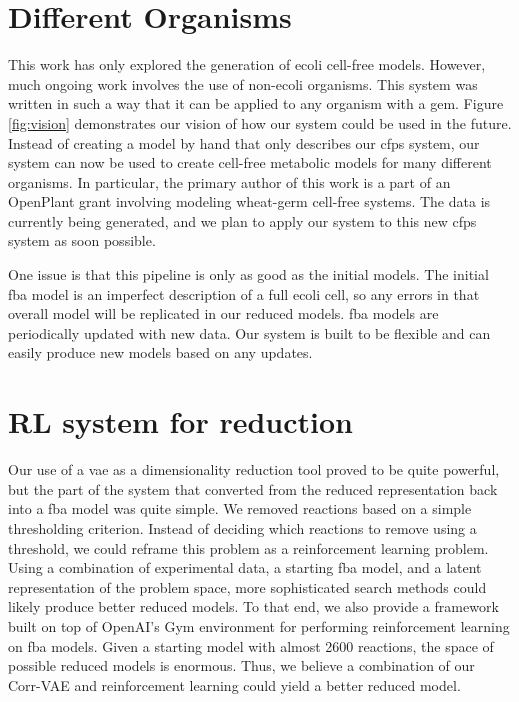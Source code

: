 \section{Different Organisms}
This work has only explored the generation of \gls{ecoli} cell-free models.
However, much ongoing work involves the use of non-\gls{ecoli} organisms.
This system was written in such a way that it can be applied to any organism with a \gls{gem}.
Figure \ref{fig:vision} demonstrates our vision of how our system could be used in the future.
Instead of creating a model by hand that only describes our \gls{cfps} system, our system can now be used to create cell-free metabolic models for many different organisms.
In particular, the primary author of this work is a part of an OpenPlant grant involving modeling wheat-germ cell-free systems.
The data is currently being generated, and we plan to apply our system to this new \gls{cfps} system as soon possible.

One issue is that this pipeline is only as good as the initial models.
The initial \gls{fba} model is an imperfect description of a full \gls{ecoli} cell, so any errors in that overall model will be replicated in our reduced models.
\gls{fba} models are periodically updated with new data.
Our system is built to be flexible and can easily produce new models based on any updates.

\section{RL system for reduction}
Our use of a \gls{vae} as a dimensionality reduction tool proved to be quite powerful, but the part of the system that converted from the reduced representation back into a \gls{fba} model was quite simple.
We removed reactions based on a simple thresholding criterion.
Instead of deciding which reactions to remove using a threshold, we could reframe this problem as a reinforcement learning problem.
Using a combination of experimental data, a starting \gls{fba} model, and a latent representation of the problem space, more sophisticated search methods could likely produce better reduced models.
To that end, we also provide a framework built on top of OpenAI's Gym environment for performing reinforcement learning on \gls{fba} models.
Given a starting model with almost 2600 reactions, the space of possible reduced models is enormous.
Thus, we believe a combination of our Corr-VAE and reinforcement learning could yield a better reduced model.

